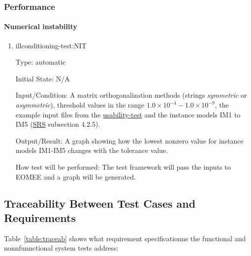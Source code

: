 \documentclass[12pt, titlepage]{article}
\begin{document}
\subsubsection{Performance}
\label{section:performance}

\paragraph{Numerical instability}

\begin{enumerate}
	
	\item{illconditioning-test:NIT}
	
	Type: automatic
	
	Initial State: N/A
	
	Input/Condition: A matrix orthogonalization methods (strings 
	\textit{symmetric} or \textit{asymmetric}), threshold values in the range 
	$1.0 \times 10^{-4} - 1.0 \times 10^{-9}$, the example input files from the
	\hyperref[section:usability]{usability-test} and the instance models IM1 to 
	IM5 (\href{https://github.com/gabrielasd/eomee/tree/cas741/docs/SRS} {SRS} 
	subsection 4.2.5).
	
	Output/Result: A graph showing how the lowest nonzero value for instance 
	models IM1-IM5 changes with the tolerance value.
	
	How test will be performed: The test framework will pass the inputs to 
	EOMEE and a graph will be generated.
	
\end{enumerate}


\subsection{Traceability Between Test Cases and Requirements}

Table~\ref{table:traceab} shows what requirement specificationns the functional and nonnfunnctional system tests address:
\end{document}
